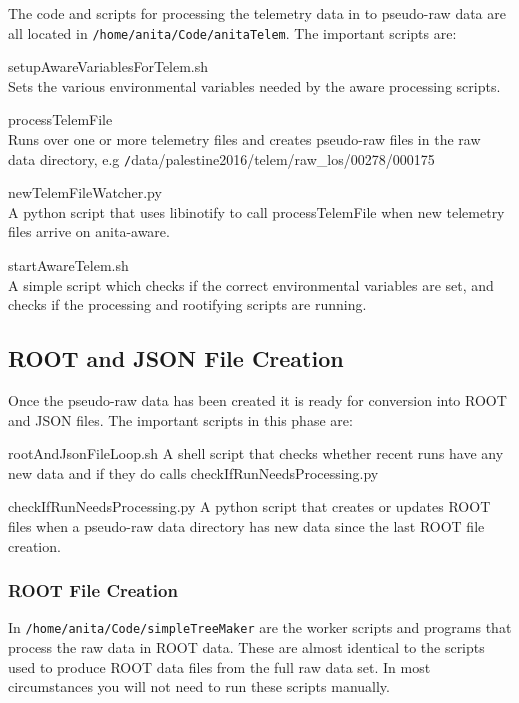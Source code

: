 \documentclass{article}
\begin{document}
The code and scripts for processing the telemetry data in to pseudo-raw data are all located in {\tt /home/anita/Code/anitaTelem}. The important scripts are:
\begin{description}
\item{setupAwareVariablesForTelem.sh} \\Sets the various environmental variables needed by the aware processing scripts.
\item{processTelemFile} \\Runs over one or more telemetry files and creates pseudo-raw files in the raw data directory, e.g  {\texttt /data/palestine2016/telem/raw\_los/00278/000175}
\item{newTelemFileWatcher.py} \\A python script that uses libinotify to call processTelemFile when new telemetry files arrive on anita-aware.
\item{startAwareTelem.sh} \\A simple script which checks if the correct environmental variables are set, and checks if the processing and rootifying scripts are running.
\end{description}

\subsection{ROOT and JSON File Creation}
Once the pseudo-raw data has been created it is ready for conversion into ROOT and JSON files. The important scripts in this phase are:
\begin{description}
\item{rootAndJsonFileLoop.sh} A shell script that checks whether recent runs have any new data and if they do calls checkIfRunNeedsProcessing.py
\item{checkIfRunNeedsProcessing.py} A python script that creates or updates ROOT files when a pseudo-raw data directory has new data since the last ROOT file creation.
\end{description}

\subsubsection{ROOT File Creation}
In {\tt /home/anita/Code/simpleTreeMaker} are the worker scripts and programs that process the raw data in ROOT data. These are almost identical to the scripts used to produce ROOT data files from the full raw data set. In most circumstances you will not need to run these scripts manually.
\end{document}
